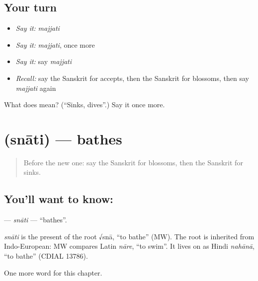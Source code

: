 \subsection*{Your turn}
\begin{itemize}
\raggedright
  \item \emph{Say it:} \emph{majjati}
  \item \emph{Say it:} \emph{majjati}, once more
  \item \emph{Say it:} say \emph{majjati}
  \item \emph{Recall:} say the Sanskrit for accepts, then the Sanskrit for blossoms, then say \emph{majjati} again
\end{itemize}

\begin{tcolorbox}[breakable,colback=teal!4,colframe=teal!35!black,title={Before you move on}]
What does  mean? (\textquotedblleft{}Sinks, dives\textquotedblright{}.) Say it once more.
\end{tcolorbox}
\section[\texorpdfstring{\sk{स्नाति} (snāti)}{स्नाति (snāti)}]{ (snāti) — bathes}

\label{lesson:SA-C206-snati}



\begin{quote}
Before the new one: say the Sanskrit for blossoms, then the Sanskrit for sinks.
\end{quote}

\subsection*{You'll want to know: }
\textbf{} — \emph{snāti} — \textquotedblleft{}bathes\textquotedblright{}.

\begin{cousinweb}
\emph{snāti} is the present of the root √snā, \textquotedblleft{}to bathe\textquotedblright{} (MW). The root is inherited from Indo-European: MW compares Latin \emph{nāre}, \textquotedblleft{}to swim\textquotedblright{}. It lives on as Hindi \emph{nahānā}, \textquotedblleft{}to bathe\textquotedblright{} (CDIAL 13786).
\end{cousinweb}

\begin{grammarlens}[title={What you've built}]
One more word for this chapter.
\end{grammarlens}

